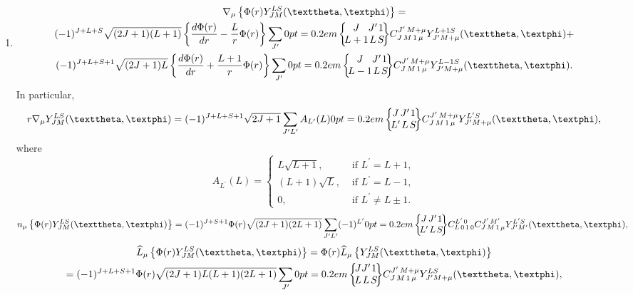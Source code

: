\begin{enumerate}[label=(\alph*)]
\item
\begin{multline}
\nabla_{\mu}\left\{\Phi(r) Y_{J M}^{L S}(\vartheta, \varphi)\right\}=\\
(-1)^{J+L+S} \sqrt{(2 J+1)(L+1)}\left\{\frac{d \Phi(r)}{d r}-\frac{L}{r} \Phi(r)\right\}
 \sum_{J^{\prime}}\sixj{J}{J^{\prime}}{1}{L+1}{L}{S} \clebsch{J}{M}{1}{\mu}{J^{\prime}}{M+\mu} Y_{J^{\prime} M+\mu}^{L+1 S}(\vartheta, \varphi)+\\
 (-1)^{J+L+S+1} \sqrt{(2 J+1) L}\left\{\frac{d \Phi(r)}{d r}+\frac{L+1}{r} \Phi(r)\right\} 
 \sum_{J^{\prime}}\sixj{J}{J^{\prime}}{1}{L-1}{L}{S} \clebsch{J}{M}{1}{\mu}{J^{\prime}}{M+\mu} Y_{J^{\prime} M+\mu}^{L-1 S}(\vartheta, \varphi). \label{eq:7:1:24}
\end{multline}
In particular,
\begin{equation}
r \nabla_{\mu} Y_{J M}^{L S}(\vartheta, \varphi)=(-1)^{J+L+S+1} \sqrt{2 J+1} \sum_{J^{\prime} L^{\prime}} A_{L^{\prime}}(L)\sixj{J}{J^{\prime}}{1}{L^{\prime}}{L}{S}\label{eq:7:1:25} \clebsch{J}{M}{1}{\mu}{J^{\prime}}{M+\mu} Y_{J^{\prime} M+\mu}^{L^{\prime} S}(\vartheta, \varphi) ,
\end{equation}
where
\[
A_{L^{\prime}}(L)= \begin{cases}L \sqrt{L+1}, & \text { if } L^{\prime}=L+1, \\
(L+1) \sqrt{L}, & \text { if } L^{\prime}=L-1, \\
0, & \text { if } L^{\prime} \neq L \pm 1 .\end{cases}\]
\begin{equation}
n_{\mu}\left\{\Phi(r) Y_{J M}^{L S}(\vartheta, \varphi)\right\}=(-1)^{J+S+1} \Phi(r) \sqrt{(2 J+1)(2 L+1)} \sum_{J^{\prime} L^{\prime}}(-1)^{L^{\prime}}\sixj{J}{J^{\prime}}{1}{L^{\prime}}{L}{S} \clebsch{L}{0}{1}{0}{L^{\prime}}{0} \clebsch{J}{M}{1}{\mu}{J^{\prime}}{M^{\prime}} Y_{J^{\prime} M^{\prime}}^{L^{\prime} S}(\vartheta, \varphi) , \label{eq:7:1:26}
\end{equation}
\begin{multline}
\widehat{L}_{\mu}\left\{\Phi(r) Y_{J M}^{L S}(\vartheta, \varphi)\right\}=\Phi(r) \widehat{L}_{\mu}\left\{Y_{J M}^{L S}(\vartheta, \varphi)\right\} \\
=(-1)^{J+L+S+1} \Phi(r) \sqrt{(2 J+1) L(L+1)(2 L+1)} \sum_{J^{\prime}}\sixj{J}{J^{\prime}}{1}{L}{L}{S} \clebsch{J}{M}{1}{\mu}{J^{\prime}}{M+\mu} Y_{J^{\prime} M+\mu}^{L S}(\vartheta, \varphi) ,\label{eq:7:1:27}
\end{multline}

\end{enumerate}
